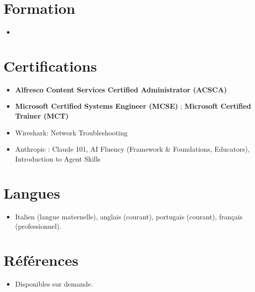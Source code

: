 \documentclass[11pt,a4paper,sans]{moderncv}
\begin{document}
\section{Formation}
\vspace{1pt}
\begin{itemize}

\item{}

\end{itemize}


\section{Certifications}
\vspace{1pt}
\begin{itemize}
\item \textbf{Alfresco Content Services Certified Administrator (ACSCA)}
\item \textbf{Microsoft Certified Systems Engineer (MCSE)} ; \textbf{Microsoft Certified Trainer (MCT)}
\item Wireshark: Network Troubleshooting
\item Anthropic : Claude 101, AI Fluency (Framework \& Foundations, Educators), Introduction to Agent Skills
\end{itemize}


\section{Langues}
\vspace{1pt}
\begin{itemize}
\item Italien (langue maternelle), anglais (courant), portugais (courant), français (professionnel).
\end{itemize}


\section{Références}
\vspace{1pt}
\begin{itemize}
\item{Disponibles sur demande.}
\end{itemize}
\end{document}
